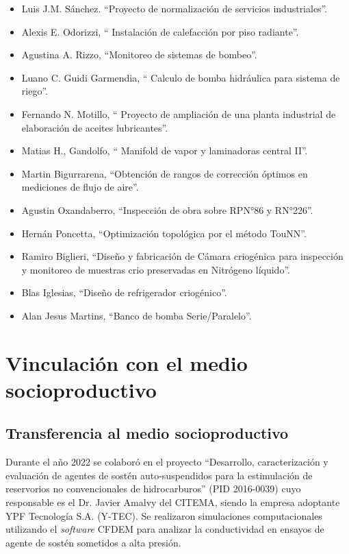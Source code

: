 \documentclass[a4paper,11pt,twoside,final,titlepage,onecolumn,openright]{report}
\begin{document}
\begin{itemize}
    \item Luis J.M. Sánchez. ``Proyecto de normalización de servicios industriales''.
    \item Alexis E. Odorizzi, `` Instalación de calefacción por piso radiante''.
    \item Agustina A. Rizzo, ``Monitoreo de sistemas de bombeo''.
    \item Luano C. Guidi Garmendia, `` Calculo de bomba hidráulica para sistema de riego''.
    \item Fernando N. Motillo, `` Proyecto de ampliación de una planta industrial de elaboración de aceites lubricantes''.
    \item Matias H., Gandolfo, `` Manifold de vapor y laminadoras central II''.
    \item Martin Bigurrarena, ``Obtención de rangos de corrección óptimos en mediciones de flujo de aire''.
    \item Agustin Oxandaberro, ``Inspección de obra sobre RPN°86 y RN°226''.
    \item Hernán Poncetta, ``Optimización topológica por el método TouNN''.
    \item Ramiro Biglieri, ``Diseño y fabricación de Cámara criogénica para inspección y monitoreo de muestras crio preservadas en Nitrógeno líquido''.
    \item Blas Iglesias, ``Diseño de refrigerador criogénico''.
    \item Alan Jesus Martins, ``Banco de bomba Serie/Paralelo''.
\end{itemize}



\chapter{Vinculación con el medio socioproductivo}

\section{Transferencia al medio socioproductivo}

Durante el año 2022 se colaboró en el proyecto ``Desarrollo, caracterización y evaluación de agentes de sostén auto-suspendidos para la estimulación de reservorios no convencionales de hidrocarburos'' (PID 2016-0039) cuyo responsable es el Dr. Javier Amalvy del CITEMA, siendo la empresa adoptante YPF Tecnología S.A. (Y-TEC). Se realizaron simulaciones computacionales utilizando el \textit{software} CFDEM para analizar la conductividad en ensayos de agente de sostén sometidos a alta presión.
\end{document}
